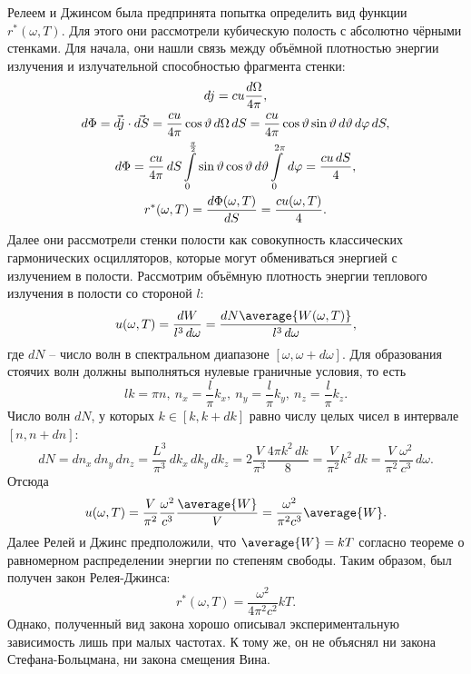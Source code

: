 \documentclass{hedexams}
\begin{document}
Релеем и Джинсом была предпринята попытка определить вид функции
\( r^*(\omega, T) \). Для этого они рассмотрели кубическую полость с абсолютно
чёрными стенками. Для начала, они нашли связь между объёмной плотностью энергии
излучения и излучательной способностью фрагмента стенки:
\begin{gather*}
    dj = cu\frac{d\Omega}{4\pi},\\
    d\Phi = \vec{dj}\cdot\vec{dS} = \frac{cu}{4\pi}\cos\vartheta\, d\Omega\,dS =
    \frac{cu}{4\pi}\cos\vartheta\sin\vartheta\, d\vartheta\, d\varphi\,dS,\\
    d\Phi = \frac{cu}{4\pi}\,dS\int\limits_0^\frac{\pi}{2}\sin\vartheta\cos\vartheta
    \, d\vartheta\int\limits_0^{2\pi}\, d\varphi = \frac{cu\,dS}{4},\\
    r^*(\omega, T) = \frac{d\Phi(\omega, T)}{dS} = \frac{cu(\omega, T)}{4}.
\end{gather*}
Далее они рассмотрели стенки полости как совокупность классических гармонических
осцилляторов, которые могут обмениваться энергией с излучением в полости.
Рассмотрим объёмную плотность энергии теплового излучения в полости со стороной
\( l \):
\[
    u(\omega, T) = \frac{dW}{l^3\d\omega} =
    \frac{dN\average{W(\omega, T)}}{l^3\d\omega},
\]
где \( dN \) -- число волн в спектральном диапазоне
\( [\omega, \omega+d\omega] \). Для образования стоячих волн должны выполняться
нулевые граничные условия, то есть
\[
    lk = \pi n,\ n_x = \frac{l}{\pi}k_x,\ n_y = \frac{l}{\pi}k_y,\
    n_z = \frac{l}{\pi}k_z.
\]
Число волн \( dN \), у которых \( k\in[k, k+dk] \) равно числу целых чисел в
интервале \( [n, n+dn] \):
\[
    dN = dn_x\,dn_y\,dn_z = \frac{L^3}{\pi^3}\,dk_x\,dk_y\,dk_z =
    2\frac{V}{\pi^3}\frac{4\pi k^2\,dk}{8} = \frac{V}{\pi^2}k^2\,dk =
    \frac{V}{\pi^2}\frac{\omega^2}{c^3}\,d\omega.
\]
Отсюда
\[
    u(\omega, T) =
    \frac{V}{\pi^2}\frac{\omega^2}{c^3}\frac{\average{W}}{V} =
    \frac{\omega^2}{\pi^2c^3}\average{W}.
\]
Далее Релей и Джинс предположили, что \( \average{W} = kT \) согласно
теореме о равномерном распределении энергии по степеням свободы. Таким образом,
был получен закон Релея-Джинса:
\[
    r^*(\omega, T) = \frac{\omega^2}{4\pi^2c^2}kT.
\]
Однако, полученный вид закона хорошо описывал экспериментальную зависимость лишь
при малых частотах. К тому же, он не объяснял ни закона Стефана-Больцмана, ни
закона смещения Вина.
\end{document}
